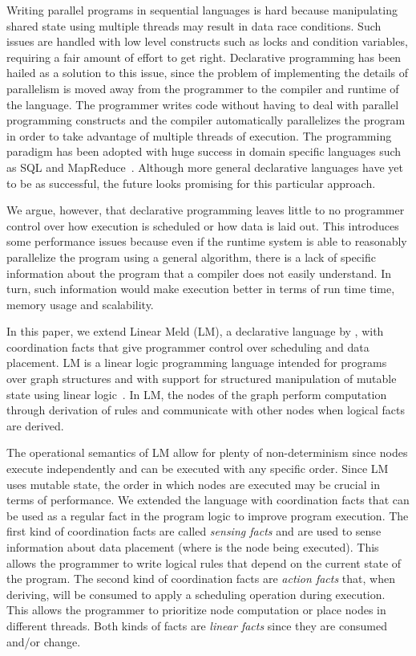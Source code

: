
Writing parallel programs in sequential languages is hard because manipulating
shared state using multiple threads may result in data race
conditions. Such issues are handled with low level constructs such as locks and
condition variables, requiring a fair amount of effort to get right.
Declarative programming has been hailed as a solution to this issue, since the
problem of implementing the details of parallelism is moved away from the programmer to the
compiler and runtime of the language. The programmer writes code
without having to deal with parallel programming constructs and the compiler
automatically parallelizes the program in order to take advantage of
multiple threads of execution.
The programming paradigm has been adopted with huge success in domain specific
languages such as SQL and MapReduce~\cite{Dean:2008:MSD:1327452.1327492}.
Although more general declarative languages have yet to be as successful, the
future looks promising for this particular approach.

We argue, however, that declarative programming leaves little to no programmer control
over how execution is scheduled or how data is laid out. This introduces some
performance issues because even if the runtime system is able to reasonably
parallelize the program using a general algorithm, there is a lack of specific
information about the program that a compiler does not easily understand. In
turn, such information would make execution better in terms of run time time,
memory usage and scalability.

In this paper, we extend Linear Meld (LM), a declarative language by
\cite{cruz-iclp14,cruz-ppdp14}, with coordination facts that give programmer control over
scheduling and data placement. LM is a linear logic programming language
intended for programs over graph structures and with
support for structured manipulation of mutable state using 
linear logic~\cite{girard-87}. In LM, the nodes of the graph perform computation
through derivation of rules and communicate with other nodes when logical facts
are derived.

The operational semantics of LM allow for plenty of
non-determinism since nodes execute independently and can be executed with
any specific order. Since LM uses mutable state, the order in which nodes are
executed may be crucial in terms of performance. We extended the language with
coordination facts that can be used as a regular fact in the program logic to
improve program execution.
The first kind of coordination facts are
called \emph{sensing facts} and are used to sense information about data
placement (where is the node being executed). This allows the programmer to
write logical rules that depend on the current state of the program. The second
kind of coordination facts are \emph{action facts} that, when deriving, will be
consumed to apply a scheduling operation during execution. This allows the
programmer to prioritize node computation or place nodes in different threads.
Both kinds of facts are \emph{linear facts} since they are consumed and/or change.

